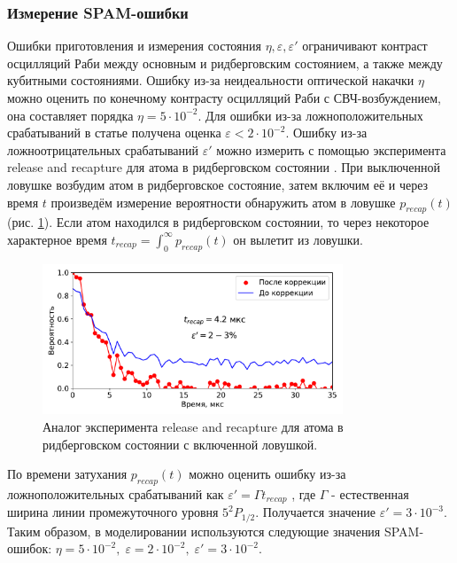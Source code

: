 \subsubsection{Измерение SPAM-ошибки}

Ошибки приготовления и измерения состояния $\eta, \varepsilon, \varepsilon'$ ограничивают контраст осцилляций Раби между основным и ридберговским состоянием, а также между кубитными состояниями. Ошибку из-за неидеальности оптической накачки $\eta$ можно оценить по конечному контрасту осцилляций Раби с СВЧ-возбуждением, она составляет порядка $\eta = 5 \cdot 10^{-2}$. Для ошибки из-за ложноположительных срабатываний в статье \cite{Browayes} получена оценка $\varepsilon < 2 \cdot 10^{-2}$. Ошибку из-за ложноотрицательных срабатываний $\varepsilon'$ можно измерить с помощью эксперимента release and recapture для атома в ридберговском состоянии \cite{Browayes}. При выключенной ловушке возбудим атом в ридберговское состояние, затем включим её и через время $t$ произведём измерение вероятности обнаружить атом в ловушке $p_{recap}(t)$ (рис. \ref{fig:rr_antitrap}). Если атом находился в ридберговском состоянии, то через некоторое характерное время $t_{recap} = \int_{0}^{\infty}p_{recap}(t)$ он вылетит из ловушки. 

\begin{figure}[H]
	\centering
	\includegraphics[width=0.8\textwidth]{images/rr_antitrap.pdf}
	\caption{Аналог эксперимента release and recapture для атома в ридберговском состоянии с включенной ловушкой. }
	\label{fig:rr_antitrap}
\end{figure}

По времени затухания $p_{recap}(t)$ можно оценить ошибку из-за ложноположительных срабатываний как $\varepsilon' = \Gamma t_{recap}$ \cite{Browayes}, где $\Gamma$ - естественная ширина линии промежуточного уровня $5^{2}P_{1/2}$. Получается значение $\varepsilon' = 3 \cdot 10^{-3}$. Таким образом, в моделировании используются следующие значения SPAM-ошибок: $\eta = 5\cdot 10^{-2}, \; \varepsilon = 2\cdot 10^{-2}, \; \varepsilon' = 3 \cdot 10^{-2}$.

